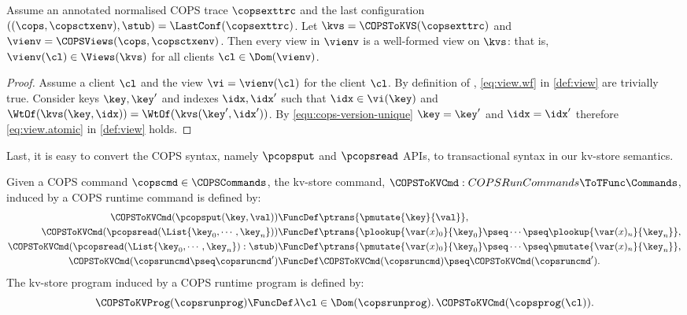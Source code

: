 \label{sec:cops-well-formed-encoded-view}
\begin{proposition}
\label{prop:cops-well-formed-view}
Assume an annotated normalised COPS trace \( \copsexttrc \) and the last configuration \( ((\cops, \copsctxenv),\stub) = \LastConf(\copsexttrc) \).
Let \( \kvs = \COPSToKVS(\copsexttrc) \) and \( \vienv = \COPSViews(\cops, \copsctxenv) \).
Then every view in \( \vienv \) is a well-formed view on \( \kvs \):
that is, \( \vienv(\cl) \in \Views(\kvs) \) for all clients \( \cl \in \Dom(\vienv) \).
\end{proposition}
\begin{proof}
Assume a client \( \cl \) and the view \( \vi = \vienv(\cl) \) for the client \( \cl \).
By definition of \COPSViews, \cref{eq:view.wf} in \cref{def:view} are trivially true.
Consider keys \( \key,\key' \) and indexes \( \idx,\idx' \) 
such that \( \idx \in \vi(\key) \) and \( \WtOf(\kvs(\key,\idx)) = \WtOf(\kvs(\key',\idx')) \).
By \cref{equ:cops-version-unique} \( \key = \key' \) and \( \idx = \idx' \)
therefore \cref{eq:view.atomic}  in \cref{def:view} holds.
\end{proof}

Last, it is easy to convert the COPS syntax, namely \( \pcopsput\) and \( \pcopsread \) APIs,
to transactional syntax in our kv-store semantics.

\begin{definition}
Given a COPS command \( \copscmd \in \COPSCommands \),
the kv-store command, \( \COPSToKVCmd : COPSRunCommands \ToTFunc \Commands \),
induced by a COPS runtime command is defined by:
\begin{align*}
   \COPSToKVCmd(\pcopsput(\key,\val)) & \FuncDef \ptrans{ \pmutate{\key}{\val} } ,
\\ \COPSToKVCmd(\pcopsread(\List{\key_0, \cdots, \key_n })) 
        & \FuncDef \ptrans{ \plookup{\var(x)_0}{\key_0} \pseq \cdots \pseq \plookup{\var(x)_n}{\key_n}  } ,
\\ \COPSToKVCmd(\pcopsread(\List{\key_0, \cdots, \key_n }) : \stub) 
        & \FuncDef \ptrans{ \pmutate{\var(x)_0}{\key_0} \pseq \cdots \pseq \pmutate{\var(x)_n}{\key_n}  } ,
\\ \COPSToKVCmd(\copsruncmd \pseq \copsruncmd' ) 
        & \FuncDef \COPSToKVCmd(\copsruncmd) \pseq \COPSToKVCmd(\copsruncmd') .
\end{align*}                                                                 
The kv-store program induced by a COPS runtime program is defined by:
\[
    \COPSToKVProg(\copsrunprog) \FuncDef \lambda \cl \in \Dom(\copsrunprog) \ldotp \COPSToKVCmd(\copsprog(\cl)) .
\]
\end{definition}


